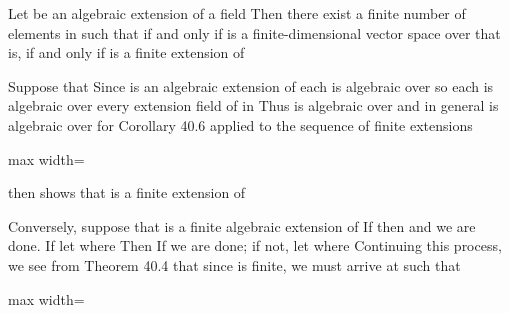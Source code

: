 \documentclass[11pt,oneside]{article}
\begin{document}
\begin{BookBody}
 Let  be an algebraic extension of a field  Then there exist a finite number of elements  in  such that  if and only if  is a finite-dimensional vector space over  that is, if and only if  is a finite extension of 

 Suppose that  Since  is an algebraic extension of  each  is algebraic over  so each  is algebraic over every extension field of  in  Thus  is algebraic over  and in general is algebraic over  for  Corollary 40.6 applied to the sequence of finite extensions

\begin{center}\begin{adjustbox}{max width=\linewidth}\end{adjustbox}\end{center}

\noindent then shows that  is a finite extension of 

Conversely, suppose that  is a finite algebraic extension of  If  then  and we are done. If  let  where  Then  If  we are done; if not, let  where  Continuing this process, we see from Theorem 40.4 that since \BookInline{[E:F]} is finite, we must arrive at  such that

\begin{center}\begin{adjustbox}{max width=\linewidth}\end{adjustbox}\end{center} \BookEnd{\blacklozenge}

\end{BookBody}
\end{document}
